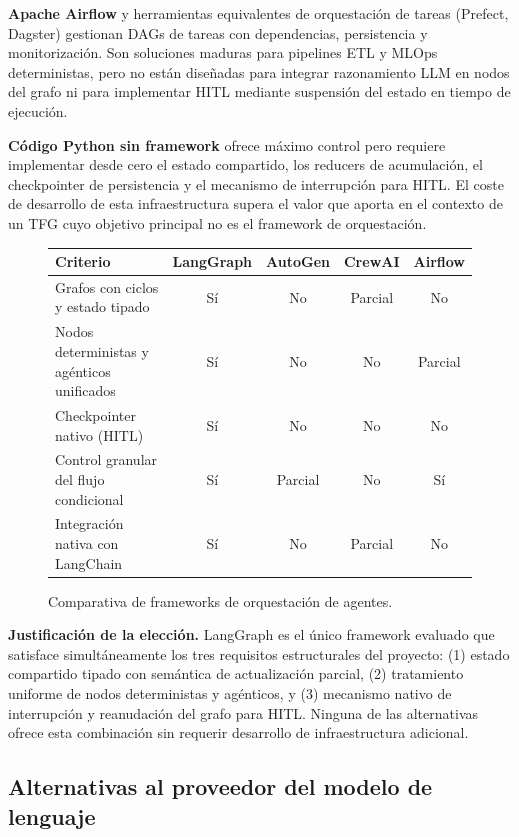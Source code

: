 \textbf{Apache Airflow} y herramientas equivalentes de orquestación de tareas (Prefect, Dagster) gestionan DAGs de tareas con dependencias, persistencia y monitorización. Son soluciones maduras para pipelines ETL y MLOps deterministas, pero no están diseñadas para integrar razonamiento LLM en nodos del grafo ni para implementar HITL mediante suspensión del estado en tiempo de ejecución.

\textbf{Código Python sin framework} ofrece máximo control pero requiere implementar desde cero el estado compartido, los reducers de acumulación, el checkpointer de persistencia y el mecanismo de interrupción para HITL. El coste de desarrollo de esta infraestructura supera el valor que aporta en el contexto de un TFG cuyo objetivo principal no es el framework de orquestación.

\begin{figure}[H]
\centering
\begin{tabular}{lcccc}
\hline
\textbf{Criterio} & \textbf{LangGraph} & \textbf{AutoGen} & \textbf{CrewAI} & \textbf{Airflow} \\
\hline
Grafos con ciclos y estado tipado & Sí & No & Parcial & No \\
Nodos deterministas y agénticos unificados & Sí & No & No & Parcial \\
Checkpointer nativo (HITL) & Sí & No & No & No \\
Control granular del flujo condicional & Sí & Parcial & No & Sí \\
Integración nativa con LangChain & Sí & No & Parcial & No \\
\hline
\end{tabular}
\caption{Comparativa de frameworks de orquestación de agentes.}
\label{tab:alt-langgraph}
\end{figure}

\textbf{Justificación de la elección.} LangGraph es el único framework evaluado que satisface simultáneamente los tres requisitos estructurales del proyecto: (1) estado compartido tipado con semántica de actualización parcial, (2) tratamiento uniforme de nodos deterministas y agénticos, y (3) mecanismo nativo de interrupción y reanudación del grafo para HITL. Ninguna de las alternativas ofrece esta combinación sin requerir desarrollo de infraestructura adicional.


\subsection{Alternativas al proveedor del modelo de lenguaje}
\label{sec:alt-proveedor}


